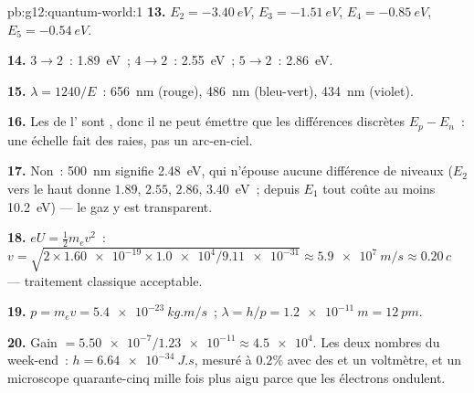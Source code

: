 \begin{solution}{pb:g12:quantum-world:1}
\textbf{13.} $E_2 = \qty{-3.40}{eV}$, $E_3 = \qty{-1.51}{eV}$,
$E_4 = \qty{-0.85}{eV}$, $E_5 = \qty{-0.54}{eV}$.

\textbf{14.} $3 \to 2$~: \qty{1.89}{eV}~; $4 \to 2$~: \qty{2.55}{eV}~;
$5 \to 2$~: \qty{2.86}{eV}.

\textbf{15.} $\lambda = 1240/E$~: \qty{656}{nm} (rouge), \qty{486}{nm}
(bleu-vert), \qty{434}{nm} (violet).

\textbf{16.} Les  de l' sont
, donc il ne peut émettre que les
différences discrètes $E_p - E_n$~: une échelle fait des raies, pas un
arc-en-ciel.

\textbf{17.} Non~: \qty{500}{nm} signifie \qty{2.48}{eV}, qui n'épouse
aucune différence de niveaux ($E_2$ vers le haut donne $1.89$, $2.55$,
$2.86$, \qty{3.40}{eV}~; depuis $E_1$ tout coûte au moins
\qty{10.2}{eV}) --- le gaz y est transparent.

\textbf{18.} $eU = \tfrac12 m_e v^2$~: $v = \sqrt{2 \times
\num{1.60e-19} \times \num{1.0e4}/\num{9.11e-31}} \approx
\qty{5.9e7}{m/s} \approx 0.20\,c$ --- traitement classique acceptable.

\textbf{19.} $p = m_e v = \qty{5.4e-23}{kg.m/s}$~;
$\lambda = h/p = \qty{1.2e-11}{m} = \qty{12}{pm}$.

\textbf{20.} Gain $= \num{5.50e-7}/\num{1.23e-11} \approx \num{4.5e4}$.
Les deux nombres du week-end~: $h = \qty{6.64e-34}{J.s}$, mesuré à
$0.2\%$ avec des  et un voltmètre, et
un microscope quarante-cinq mille fois plus aigu parce que les
électrons ondulent.
\end{solution}
